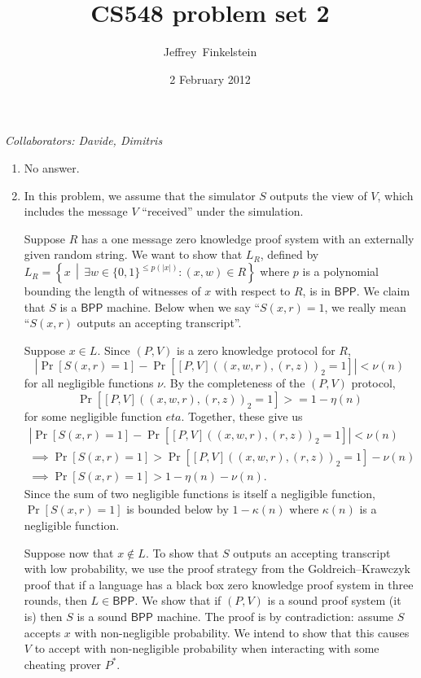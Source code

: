 \documentclass{article}
\author{Jef{}frey~Finkelstein}
\date{2 February 2012}
\title{CS548 problem set 2}
\newcommand{\collaborators}[1]{\emph{Collaborators: #1}}
\newcommand{\BPP}{\mathsf{BPP}}
\begin{document}
\maketitle
\collaborators{Davide, Dimitris}
\begin{enumerate}
\item No answer.
\item
  In this problem, we assume that the simulator $S$ outputs the view of $V$, which includes the message $V$ ``received'' under the simulation.

  Suppose $R$ has a one message zero knowledge proof system with an externally given random string.
  We want to show that $L_R$, defined by $L_R=\left\{ x \,\middle|\, \exists w\in\{0, 1\}^{\leq p(|x|)}\colon (x, w)\in R \right\}$ where $p$ is a polynomial bounding the length of witnesses of $x$ with respect to $R$, is in $\BPP$.
  We claim that $S$ is a $\BPP$ machine.
  Below when we say ``$S(x, r)=1$, we really mean ``$S(x, r)$ outputs an accepting transcript''.

  Suppose $x\in L$.
  Since $(P, V)$ is a zero knowledge protocol for $R$,
  \begin{displaymath}
    \left|\Pr\left[S(x,r)=1\right] - \Pr\left[[P,V]((x, w, r), (r, z))_2=1\right]\right| < \nu(n)
  \end{displaymath}
  for all negligible functions $\nu$.
  By the completeness of the $(P, V)$ protocol,
  \begin{displaymath}
    \Pr\left[[P, V]((x, w, r), (r, z))_2 = 1\right] >= 1 - \eta(n)
  \end{displaymath}
  for some negligible function $eta$.
  Together, these give us
  \begin{align*}
    \left|\Pr\left[S(x,r)=1\right] - \Pr\left[[P,V]((x, w, r), (r, z))_2=1\right]\right| < \nu(n) \\
    \implies \Pr\left[S(x,r)=1\right] > \Pr\left[[P,V]((x, w, r), (r, z))_2=1\right] - \nu(n) \\
    \implies \Pr\left[S(x,r)=1\right] > 1 - \eta(n) - \nu(n).
  \end{align*}
  Since the sum of two negligible functions is itself a negligible function, $\Pr[S(x,r)=1]$ is bounded below by $1-\kappa(n)$ where $\kappa(n)$ is a negligible function.

  Suppose now that $x\notin L$.
  To show that $S$ outputs an accepting transcript with low probability, we use the proof strategy from the Goldreich--Krawczyk proof that if a language has a black box zero knowledge proof system in three rounds, then $L\in\BPP$.
  We show that if $(P, V)$ is a sound proof system (it is) then $S$ is a sound $\BPP$ machine.
  The proof is by contradiction: assume $S$ accepts $x$ with non-negligible probability.
  We intend to show that this causes $V$ to accept with non-negligible probability when interacting with some cheating prover $P^*$.


\end{enumerate}
\end{document}
